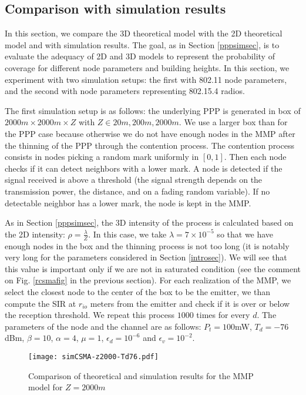 \documentclass{sig-alternate-05-2015}
\begin{document}
\subsection{Comparison with simulation results}
\label{mmpsimsec}

In this section, we compare the 3D theoretical model with the 2D theoretical model and with simulation results. The goal, as in Section \ref{pppsimsec}, is to evaluate the adequacy of 2D and 3D models to represent the probability of coverage for different node parameters and building heights. In this section, we experiment with two simulation setups: the first with 802.11 node parameters, and the second with node parameters representing 802.15.4 radios.

The first simulation setup is as follows: the underlying PPP is generated in box of $2000m\times 2000m \times Z$ with $Z\in {20m,200m,2000m}$. We use a larger box than for the PPP case because otherwise we do not have enough nodes in the MMP after the thinning of the PPP through the contention process. The contention process consists in nodes picking a random mark uniformly in $[0,1]$. Then each node checks if it can detect neighbors with a lower mark. A node is detected if the signal received is above a threshold (the signal strength depends on the transmission power, the distance, and on a fading random variable). If no detectable neighbor has a lower mark, the node is kept in the MMP.

As in Section \ref{pppsimsec}, the 3D intensity of the process is calculated based on the 2D intensity: $\rho=\frac{\lambda}{Z}$. In this case, we take $\lambda=7\times 10^{-5}$ so that we have enough nodes in the box and the thinning process is not too long (it is notably very long for the parameters considered in Section \ref{introsec}). We will see that this value is important only if we are not in saturated condition (see the comment on Fig. \ref{rcsmafig} in the previous section). For each realization of the MMP, we select the closest node to the center of the box to be the emitter, we than compute the SIR at $r_{io}$ meters from the emitter and check if it is over or below the reception threshold. We repeat this process $1000$ times for every $d$. The parameters of the node and the channel are as follows: $P_t=100$mW, $T_d=-76$dBm, $\beta=10$, $\alpha=4$, $\mu=1$, $\epsilon_d=10^{-6}$ and $\epsilon_v=10^{-2}$.

\begin{figure}[ht]
  \centering
  \texttt{[image: simCSMA-z2000-Td76.pdf]}
  \caption{Comparison of theoretical and simulation results for the MMP model for $Z=2000m$}
  \label{sim2000fig}
\end{figure}
\end{document}
